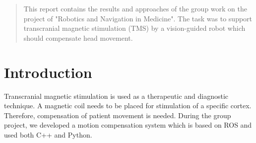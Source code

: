 \documentclass[conference]{IEEEtran}
\begin{document}
\maketitle

\begin{abstract}
This report contains the results and approaches of the group work on the project of "Robotics and Navigation in Medicine". The task was to support transcranial magnetic stimulation (TMS) by a vision-guided robot which should compensate head movement. 
\end{abstract}





%
\IEEEpeerreviewmaketitle



\section{Introduction}
Transcranial magnetic stimulation is used as a therapeutic and diagnostic technique. A magnetic coil needs to be placed for stimulation of a specific cortex. Therefore, compensation of patient movement is needed. During the group project, we developed a motion compensation system which is based on ROS and used both C++ and Python.



%
%
\end{document}
